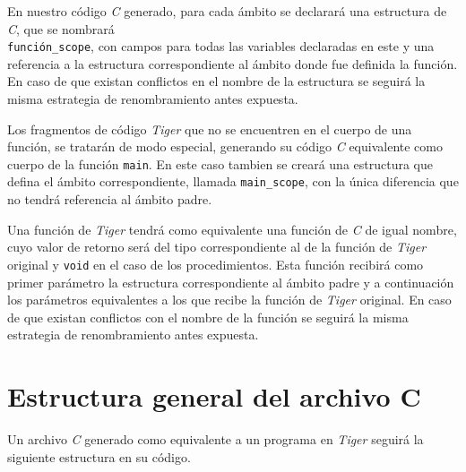 \documentclass{article}
\begin{document}
En nuestro código \textit{C} generado, para cada ámbito se declarará una
estructura de \textit{C}, que se nombrará \\ \texttt{función\_scope}, con
campos para todas las variables declaradas en este y una referencia a la
estructura correspondiente al ámbito donde fue definida la función. En caso de
que existan conflictos en el nombre de la estructura se seguirá la misma
estrategia de renombramiento antes expuesta.

Los fragmentos de código \textit{Tiger} que no se encuentren en el
cuerpo de una función, se tratarán de modo especial, generando su
código \textit{C} equivalente como cuerpo de la función \texttt{main}. En este
caso tambien se creará una estructura que defina el ámbito correspondiente,
llamada \texttt{main\_scope}, con la única diferencia que no tendrá referencia
al ámbito padre.

Una función de \textit{Tiger} tendrá como equivalente una función de \textit{C}
de igual nombre, cuyo valor de retorno será del tipo correspondiente al de la
función de \textit{Tiger} original y \texttt{void} en el caso de los
procedimientos. Esta función recibirá como primer parámetro la estructura
correspondiente al ámbito padre y a continuación los parámetros equivalentes a
los que recibe la función de \textit{Tiger} original. En caso de que existan
conflictos con el nombre de la función se seguirá la misma estrategia de
renombramiento antes expuesta.



\section{Estructura general del archivo C}

Un archivo \textit{C} generado como equivalente a un programa en \textit{Tiger}
seguirá la siguiente estructura en su código.
\end{document}
